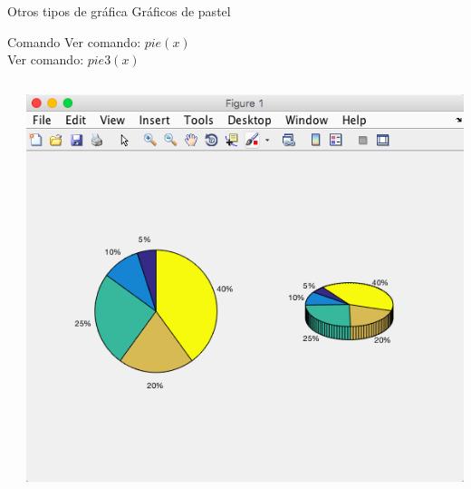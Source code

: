 \documentclass{bredelebeamer}
\begin{document}
\begin{frame}{Otros tipos de gráfica}
Gráficos de pastel
\begin{exampleblock}{Comando}
Ver comando: \textbf{$pie(x)$}\\
Ver comando: \textbf{$pie3(x)$}\\
\end{exampleblock}
\begin{columns}
\begin{column}{0.5\textwidth}
\begin{center}
\end{center}
\end{column}
\begin{column}{0.5\textwidth}
\begin{center}
\includegraphics[scale=0.2]{images/pantalla25.png}
\end{center}
\end{column}
\end{columns}
\end{frame}
\end{document}
